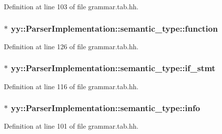 Definition at line 103 of file grammar.tab.hh.

\hypertarget{unionyy_1_1_parser_implementation_1_1semantic__type_a9cdcc26d79549ce811865f6ada51f50c}{
\subsubsection[{function}]{$\ast$ {\bf yy::ParserImplementation::semantic\_\-type::function}}}
\label{unionyy_1_1_parser_implementation_1_1semantic__type_a9cdcc26d79549ce811865f6ada51f50c}


Definition at line 126 of file grammar.tab.hh.

\hypertarget{unionyy_1_1_parser_implementation_1_1semantic__type_ab50087c2fc338968f2b18c33fb4de756}{
\subsubsection[{if\_\-stmt}]{$\ast$ {\bf yy::ParserImplementation::semantic\_\-type::if\_\-stmt}}}
\label{unionyy_1_1_parser_implementation_1_1semantic__type_ab50087c2fc338968f2b18c33fb4de756}


Definition at line 116 of file grammar.tab.hh.

\hypertarget{unionyy_1_1_parser_implementation_1_1semantic__type_a7e85a38677256f9c59605fce47e1aa61}{
\subsubsection[{info}]{$\ast$ {\bf yy::ParserImplementation::semantic\_\-type::info}}}
\label{unionyy_1_1_parser_implementation_1_1semantic__type_a7e85a38677256f9c59605fce47e1aa61}


Definition at line 101 of file grammar.tab.hh.

